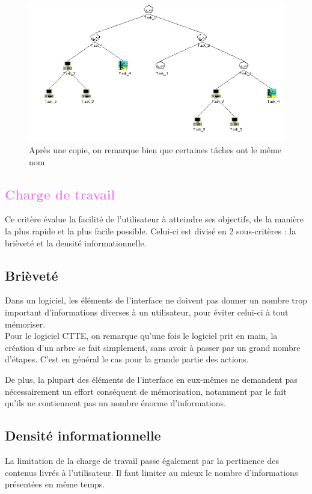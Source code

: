 \documentclass[12pt, a4paper]{article}
\begin{document}
\begin{figure}[h]
\begin{center}
   \includegraphics[scale = 0.7]{copierate.jpg}
	\caption{Après une copie, on remarque bien que certaines tâches ont le même nom}
	\end{center}
\end{figure}
\newpage
\textcolor{Violet}{\section{Charge de travail}}
Ce critère évalue la facilité de l'utilisateur à atteindre ses objectifs, de la manière la plus rapide et la plus facile possible. Celui-ci est divisé en 2 sous-critères : la brièveté et la densité informationnelle.

\textcolor{NavyBlue}{\subsection{Brièveté}}
Dans un logiciel, les éléments de l'interface ne doivent pas donner un nombre trop important d'informations diverses à un utilisateur, pour éviter celui-ci à tout mémoriser.\\


Pour le logiciel CTTE, on remarque qu'une fois le logiciel prit en main, la création d'un arbre se fait simplement, sans avoir à passer par un grand nombre d'étapes. C'est en général le cas pour la grande partie des actions. 


De plus, la plupart des éléments de l'interface en eux-mêmes ne demandent pas nécessairement un effort conséquent de mémorisation, notamment par le fait qu'ils ne contiennent pas un nombre énorme d'informations.

\textcolor{NavyBlue}{\subsection{Densité informationnelle}}
La limitation de la charge de travail passe également par la pertinence des contenus livrés à l'utilisateur. Il faut limiter au mieux le nombre d'informations présentées en même temps.\\
\end{document}
